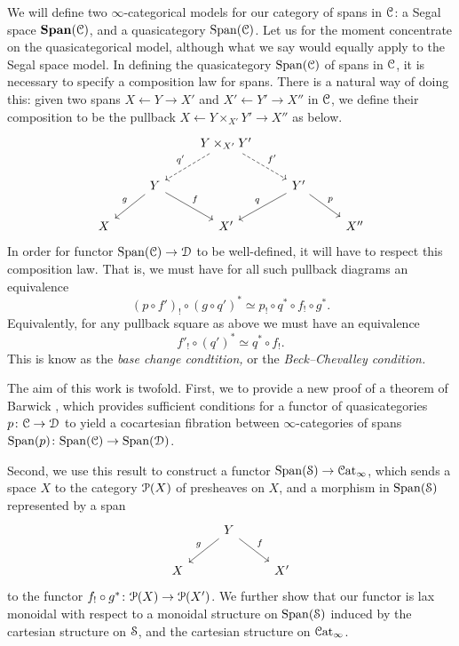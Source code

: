 \documentclass[main.tex]{subfiles}
\begin{document}
We will define two $\infty$-categorical models for our category of spans in $\category{C}$: a Segal space $\SPAN(\category{C})$, and a quasicategory $\Span(\category{C})$. Let us for the moment concentrate on the quasicategorical model, although what we say would equally apply to the Segal space model. In defining the quasicategory $\Span(\category{C})$ of spans in $\category{C}$, it is necessary to specify a composition law for spans. There is a natural way of doing this: given two spans $X \leftarrow Y \rightarrow X'$ and $X' \leftarrow Y' \rightarrow X''$ in $\category{C}$, we define their composition to be the pullback $X \leftarrow Y \times_{X'} Y' \rightarrow X''$ as below.
\begin{equation*}
  \begin{tikzcd}
    && Y \times_{X'} Y'
    \arrow[dl, dashed, swap, "q'"]
    \arrow[dr, dashed, "f'"]
    \\
    & Y
    \arrow[dl, swap, "g"]
    \arrow[dr, "f"]
    && Y'
    \arrow[dl, swap, "q"]
    \arrow[dr, "p"]
    \\
    X
    && X'
    && X''
  \end{tikzcd}
\end{equation*}
In order for functor $\Span(\category{C}) \to \category{D}$ to be well-defined, it will have to respect this composition law. That is, we must have for all such pullback diagrams an equivalence
\begin{equation*}
  (p \circ f')_{!} \circ (g \circ q')^{*} \simeq p_{!} \circ q^{*} \circ f_{!} \circ g^{*}.
\end{equation*}
Equivalently, for any pullback square as above we must have an equivalence
\begin{equation*}
  f'_{!} \circ (q')^{*} \simeq q^{*} \circ f_{!}.
\end{equation*}
This is know as the \emph{base change condtition,} or the \emph{Beck--Chevalley condition.}

The aim of this work is twofold. First, we to provide a new proof of a theorem of Barwick \cite[Thm.~12.2]{spectralmackeyfunctors1}, which provides sufficient conditions for a functor of quasicategories $p\colon \category{C} \to \category{D}$ to yield a cocartesian fibration between $\infty$-categories of spans $\Span(p)\colon \Span(\category{C}) \to \Span(\category{D})$. %

Second, we use this result to construct a functor $\Span(\category{S}) \to \ICat$, which sends a space $X$ to the category $\P(X)$ of presheaves on $X$, and a morphism in $\Span(\S)$ represented by a span
\begin{equation*}
  \begin{tikzcd}
    & Y
    \arrow[dl, swap, "g"]
    \arrow[dr, "f"]
    \\
    X
    && X'
  \end{tikzcd}
\end{equation*}
to the functor $f_{!} \circ g^{*}\colon \P(X) \to \P(X')$. We further show that our functor is lax monoidal with respect to a monoidal structure on $\Span(\S)$ induced by the cartesian structure on $\S$, and the cartesian structure on $\ICat$.
\end{document}
